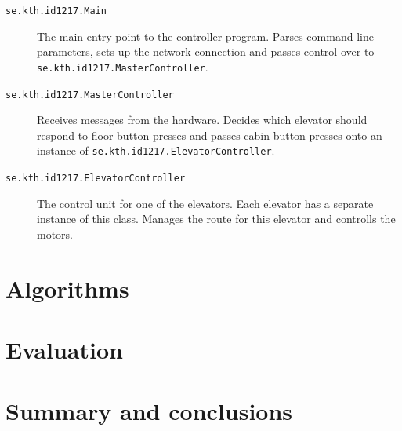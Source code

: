 \documentclass[a4paper]{article}
\begin{document}
\begin{description}

\item[\texttt{se.kth.id1217.Main}] The main entry point to the controller
    program. Parses command line parameters, sets up the network connection and
    passes control over to \texttt{se.kth.id1217.MasterController}.

\item[\texttt{se.kth.id1217.MasterController}] Receives messages from the
    hardware. Decides which elevator should respond to floor button presses and
    passes cabin button presses onto an instance of
    \texttt{se.kth.id1217.ElevatorController}.

\item[\texttt{se.kth.id1217.ElevatorController}] The control unit for one of the
    elevators. Each elevator has a separate instance of this class. Manages the
    route for this elevator and controlls the motors.

\end{description}

\section{Algorithms}

\section{Evaluation}

\section{Summary and conclusions}
\end{document}
